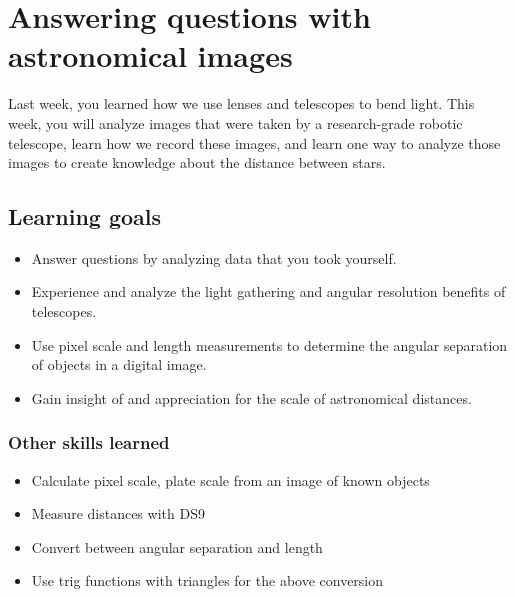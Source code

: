 \chapter{Answering questions with astronomical images}



Last week, you learned how we use lenses and telescopes to bend light. This week, you will analyze images that were taken by a research-grade robotic telescope, learn how we record these images, and learn one way to analyze those images to create knowledge about the distance between stars.


\section{Learning goals}

\begin{itemize}
	\item Answer questions by analyzing data that you took yourself.
	
	\item Experience and analyze the light gathering and angular resolution benefits of telescopes.
	
	\item Use pixel scale and length measurements to determine the angular separation of objects in a digital image.
	
	\item Gain insight of and appreciation for the scale of astronomical distances.
\end{itemize}

\subsection{Other skills learned}
\begin{itemize}
	\item Calculate pixel scale, plate scale from an image of known objects
	\item Measure distances with DS9
	\item Convert between angular separation and length
	\item Use trig functions with triangles for the above conversion
\end{itemize}

